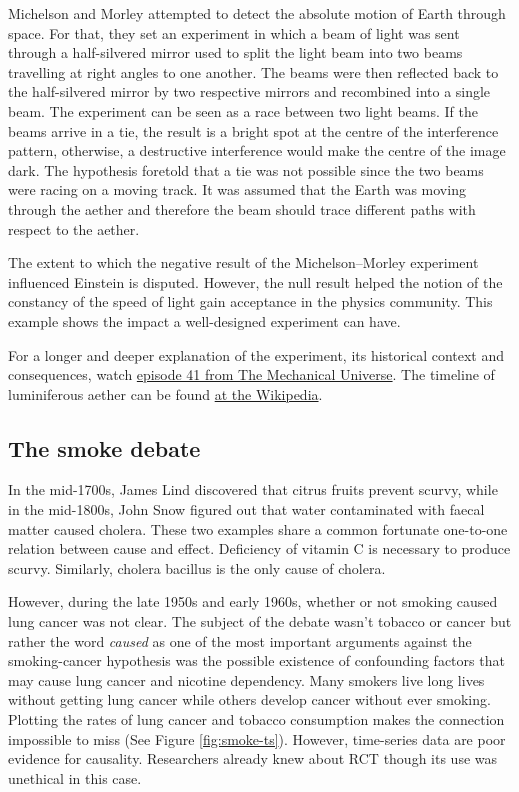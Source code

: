 \documentclass[
]{book}
\begin{document}
Michelson and Morley attempted to detect the absolute motion of Earth through space. For that, they set an experiment in which a beam of light was sent through a half-silvered mirror used to split the light beam into two beams travelling at right angles to one another. The beams were then reflected back to the half-silvered mirror by two respective mirrors and recombined into a single beam. The experiment can be seen as a race between two light beams. If the beams arrive in a tie, the result is a bright spot at the centre of the interference pattern, otherwise, a destructive interference would make the centre of the image dark. The hypothesis foretold that a tie was not possible since the two beams were racing on a moving track. It was assumed that the Earth was moving through the aether and therefore the beam should trace different paths with respect to the aether.

The extent to which the negative result of the Michelson--Morley experiment influenced Einstein is disputed. However, the null result helped the notion of the constancy of the speed of light gain acceptance in the physics community. This example shows the impact a well-designed experiment can have.

For a longer and deeper explanation of the experiment, its historical context and consequences, watch \href{https://www.youtube.com/watch?v=Ip_jdcA8fcw}{episode 41 from The Mechanical Universe}. The timeline of luminiferous aether can be found \href{https://en.wikipedia.org/wiki/Timeline_of_luminiferous_aether}{at the Wikipedia}.

\hypertarget{smoke-debate}{%
\subsection{The smoke debate}\label{smoke-debate}}

In the mid-1700s, James Lind discovered that citrus fruits prevent scurvy, while in the mid-1800s, John Snow figured out that water contaminated with faecal matter caused cholera. These two examples share a common fortunate one-to-one relation between cause and effect. Deficiency of vitamin C is necessary to produce scurvy. Similarly, cholera bacillus is the only cause of cholera.

However, during the late 1950s and early 1960s, whether or not smoking caused lung cancer was not clear. The subject of the debate wasn't tobacco or cancer but rather the word \emph{caused} as one of the most important arguments against the smoking-cancer hypothesis was the possible existence of confounding factors that may cause lung cancer and nicotine dependency. Many smokers live long lives without getting lung cancer while others develop cancer without ever smoking. Plotting the rates of lung cancer and tobacco consumption makes the connection impossible to miss (See Figure \ref{fig:smoke-ts}). However, time-series data are poor evidence for causality. Researchers already knew about RCT though its use was unethical in this case.
\end{document}
